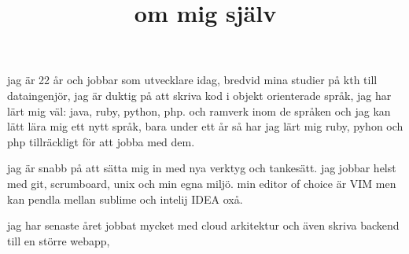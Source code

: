 \documentclass{article}
\title{om mig sj{\"a}lv}
\begin{document}
\maketitle
jag är 22 år och jobbar som utvecklare idag, bredvid mina studier på kth till dataingenjör, jag är duktig på att skriva kod i objekt orienterade språk, jag har lärt mig väl: java, ruby, python, php. och ramverk inom de språken och jag kan lätt lära mig ett nytt språk, bara under ett år så har jag lärt mig ruby, pyhon och php tillräckligt för att jobba med dem.

jag är snabb på att sätta mig in med nya verktyg och tankesätt. jag jobbar helst med git, scrumboard, unix och min egna miljö. min editor of choice är VIM men kan pendla mellan sublime och intelij IDEA oxå.

jag har senaste året jobbat mycket med cloud arkitektur och även skriva backend till en större webapp,
\end{document}
